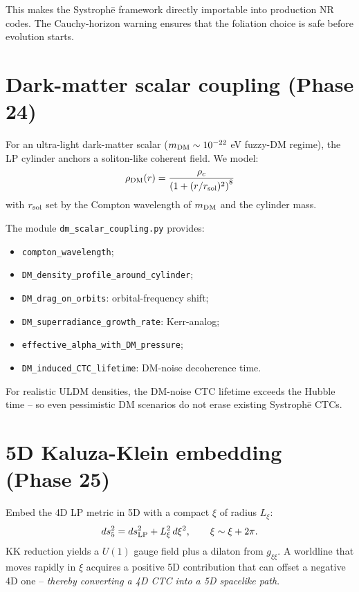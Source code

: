 \documentclass[11pt,a4paper]{article}
\begin{document}
This makes the Systroph\=e framework directly importable into
production NR codes. The Cauchy-horizon warning ensures that the
foliation choice is safe before evolution starts.

\section{Dark-matter scalar coupling (Phase 24)}

For an ultra-light dark-matter scalar ($m_{\rm DM} \sim 10^{-22}$ eV
fuzzy-DM regime), the LP cylinder anchors a soliton-like coherent
field. We model:
\[
\rho_{\rm DM}(r) = \frac{\rho_c}{\left(1 + (r/r_{\rm sol})^2\right)^8}
\]
with $r_{\rm sol}$ set by the Compton wavelength of $m_{\rm DM}$ and
the cylinder mass.

The module \texttt{dm\_scalar\_coupling.py} provides:
\begin{itemize}
\item \texttt{compton\_wavelength};
\item \texttt{DM\_density\_profile\_around\_cylinder};
\item \texttt{DM\_drag\_on\_orbits}: orbital-frequency shift;
\item \texttt{DM\_superradiance\_growth\_rate}: Kerr-analog;
\item \texttt{effective\_alpha\_with\_DM\_pressure};
\item \texttt{DM\_induced\_CTC\_lifetime}: DM-noise decoherence time.
\end{itemize}

For realistic ULDM densities, the DM-noise CTC lifetime exceeds
the Hubble time -- so even pessimistic DM scenarios do not erase
existing Systroph\=e CTCs.

\section{5D Kaluza-Klein embedding (Phase 25)}

Embed the 4D LP metric in 5D with a compact $\xi$ of radius $L_\xi$:
\[
ds_5^2 = ds_{\rm LP}^2 + L_\xi^2\,d\xi^2,\qquad \xi\sim\xi+2\pi.
\]
KK reduction yields a $U(1)$ gauge field plus a dilaton from
$g_{\xi\xi}$. A worldline that moves rapidly in $\xi$ acquires a
positive 5D contribution that can offset a negative 4D one --
\emph{thereby converting a 4D CTC into a 5D spacelike path}.
\end{document}
